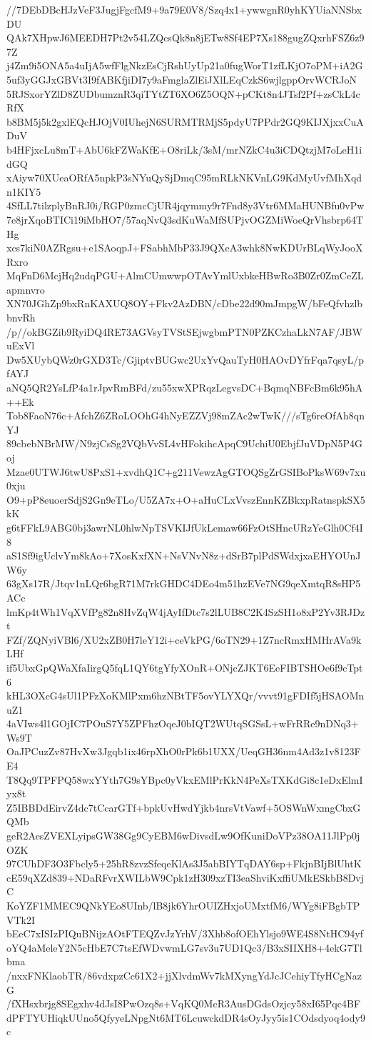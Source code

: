 //7DEbDBcHJzVeF3JugjFgcfM9+9a79E0V8/Szq4x1+ywwgnR0yhKYUiaNNSbxDU
QAk7XHpwJ6MEEDH7Pt2v54LZQcsQk8n8jETw8Sf4EP7Xs188gugZQxrhFSZ6z97Z
j4Zm9i5ONA5a4uIjA5wfFlgNkzEsCjRshUyUp21a0fugWorT1zfLKjO7oPM+iA2G
5uf3yGGJxGBVt3I9fABKfjiDI7y9aFmglaZlEiJXlLEqCzkS6wjlgppOrvWCRJoN
5RJSxorYZlD8ZUDbumznR3qiTYtZT6XO6Z5OQN+pCKt8n4JTsf2Pf+zsCkL4cRfX
b8BM5j5k2gxlEQcHJOjV0IUhejN6SURMTRMjS5pdyU7PPdr2GQ9KIJXjxxCuADuV
b4HFjxcLu8mT+AbU6kFZWaKfE+O8riLk/3sM/mrNZkC4u3iCDQtzjM7oLeH1idGQ
xAiyw70XUeaORfA5npkP3sNYuQySjDmqC95mRLkNKVnLG9KdMyUvfMhXqdn1KIY5
4SfLL7tilzplyBnRJ0i/RGP0zmcCjUR4jqymmy9r7Fnd8y3Vtr6MMaHUNBfu0vPw
7e8jrXqoBTICi19iMbHO7/57aqNvQ3sdKuWaMfSUPjvOGZMiWoeQrVhsbrp64THg
xcs7kiN0AZRgsu+e1SAoqpJ+FSabhMbP33J9QXeA3whk8NwKDUrBLqWyJooXRxro
MqFnD6McjHq2udqPGU+AlmCUmwwpOTAvYmlUxbkeHBwRo3B0Zr0ZmCeZLapmnvro
XN70JGhZp9bxRnKAXUQ8OY+Fkv2AzDBN/cDbe22d90mJmpgW/bFeQfvhzlbbnvRh
/p//okBGZib9RyiDQ4RE73AGVsyTVStSEjwgbmPTN0PZKCzhaLkN7AF/JBWuExVl
Dw5XUybQWz0rGXD3Tc/GjiptvBUGwc2UxYvQauTyH0HAOvDYfrFqa7qsyL/pfAYJ
aNQ5QR2YsLfP4a1rJpvRmBFd/zu55xwXPRqzLegvsDC+BqmqNBFcBm6k95hA++Ek
Tob8FaoN76c+AfchZ6ZRoLOOhG4hNyEZZVj98mZAc2wTwK///sTg6reOfAh8qnYJ
89cbebNBrMW/N9zjCsSg2VQbVvSL4vHFokihcApqC9UchiU0EbjfJuVDpN5P4Goj
Mzae0UTWJ6twU8PxS1+xvdhQ1C+g211VewzAgGTOQSgZrGSIBoPksW69v7xu0xju
O9+pP8euoerSdjS2Gn9eTLo/U5ZA7x+O+aHuCLxVvszEnnKZBkxpRatnspkSX5kK
g6tFFkL9ABG0bj3awrNL0hlwNpTSVKIJfUkLemaw66FzOtSHncURzYeGlh0Cf4I8
aS1Sf9igUclvYm8kAo+7XosKxfXN+NsVNvN8z+dSrB7plPdSWdxjxaEHYOUnJW6y
63gXs17R/Jtqv1nLQr6bgR71M7rkGHDC4DEo4m51hzEVe7NG9qeXmtqR8sHP5ACc
lmKp4tWh1VqXVfPg82n8HvZqW4jAyIfDtc7s2lLUB8C2K4SzSH1o8xP2Yv3RJDzt
FZf/ZQNyiVBl6/XU2xZB0H7leY12i+ceVkPG/6oTN29+1Z7ncRmxHMHrAVa9kLHf
if5UbxGpQWaXfaIirgQ5fqL1QY6tgYfyXOnR+ONjcZJKT6EeFIBTSHOe6f9cTpt6
kHL3OXcG4sUl1PFzXoKMlPxm6hzNBtTF5ovYLYXQr/vvvt91gFDIf5jHSAOMnuZ1
4aVIws4l1GOjIC7POuS7Y5ZPFhzOqeJ0bIQT2WUtqSGSsL+wFrRRe9nDNq3+Ws9T
OaJPCuzZv87HvXw3Jgqb1ix46rpXhO0rPk6b1UXX/UeqGH36nm4Ad3z1v8123FE4
T8Qq9TPFPQ58wxYYth7G9sYBpc0yVkxEMlPrKkN4PeXsTXKdGi8c1eDxElmIyx8t
Z5IBBDdEirvZ4dc7tCcarGTf+bpkUvHwdYjkb4nrsVtVawf+5OSWnWxmgCbxGQMb
geR2AesZVEXLyipsGW38Gg9CyEBM6wDivsdLw9OfKuniDoVPz38OA11JlPp0jOZK
97CUhDF3O3Fbcly5+25hR8zvzSfeqeKlAs3J5abBIYTqDAY6sp+FkjnBIjBlUhtK
cE59qXZd839+NDaRFvrXWILbW9Cpk1zH309xzTI3eaShviKxffiUMkESkbB8DvjC
KoYZF1MMEC9QNkYEo8UInb/lB8jk6YhrOUIZHxjoUMxtfM6/WYg8iFBgbTPVTk2I
bEeC7xISIzPIQuBNijzAOtFTEQZvJzYrhV/3Xhb8ofOEhYlsjo9WE4S8NtHC94yf
oYQ4aMeleY2N5cHbE7C7tsEfWDvwmLG7sv3u7UD1Qc3/B3xSIIXH8+4ekG7Tlbma
/nxxFNKlaobTR/86vdxpzCc61X2+jjXlvdmWv7kMXyngYdJcJCehiyTfyHCgNazG
/fXHsxbrjg8SEgxhv4dJsI8PwOzq8s+VqKQ0McR3AusDGdsOzjcy58xI65Pqc4BF
dPFTYUHiqkUUno5QfyyeLNpgNt6MT6LcuwckdDR4sOyJyy5is1COdsdyoq4ody9c
